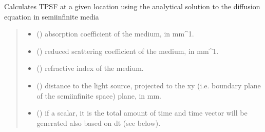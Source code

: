 \documentclass[letterpaper,10pt,english]{sphinxmanual}
\begin{document}
\begin{fulllineitems}
\label{\detokenize{_autosummary/nirfasterff.forward.analytical.semi_infinite_TR:nirfasterff.forward.analytical.semi_infinite_TR}}
\pysigstartsignatures
\pysiglinewithargsret
{}
{\sphinxparamcomma {}\sphinxparamcomma {}\sphinxparamcomma {}\sphinxparamcomma {}\sphinxparamcomma {}\sphinxparamcomma {}\sphinxparamcomma {}}
{}
\pysigstopsignatures
\sphinxAtStartPar
Calculates TPSF at a given location using the analytical solution to the diffusion equation in semi\sphinxhyphen{}infinite media
\begin{quote}\begin{description}
\begin{itemize}
\item {} 
\sphinxAtStartPar
{} () \textendash{} absorption coefficient of the medium, in mm\textasciicircum{}\sphinxhyphen{}1.

\item {} 
\sphinxAtStartPar
{} () \textendash{} reduced scattering coefficient of the medium, in mm\textasciicircum{}\sphinxhyphen{}1.

\item {} 
\sphinxAtStartPar
{} () \textendash{} refractive index of the medium.

\item {} 
\sphinxAtStartPar
{} () \textendash{} distance to the light source, projected to the x\sphinxhyphen{}y (i.e. boundary plane of the semi\sphinxhyphen{}infinite space) plane, in mm.

\item {} 
\sphinxAtStartPar
{} () \textendash{} 
\sphinxAtStartPar
if a scalar, it is the total amount of time and time vector will be generated also based on dt (see below).


\end{itemize}
\end{description}
\end{quote}
\end{fulllineitems}
\end{document}
